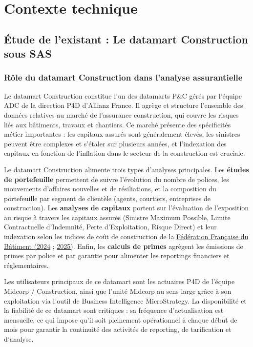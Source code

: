 \chapter{Contexte technique}

\section{Étude de l'existant : Le datamart Construction sous SAS}

\subsection{Rôle du datamart Construction dans l'analyse assurantielle}

Le datamart Construction constitue l'un des datamarts P\&C gérés par l'équipe ADC de la direction P4D d'Allianz France. Il agrège et structure l'ensemble des données relatives au marché de l'assurance construction, qui couvre les risques liés aux bâtiments, travaux et chantiers. Ce marché présente des spécificités métier importantes : les capitaux assurés sont généralement élevés, les sinistres peuvent être complexes et s'étaler sur plusieurs années, et l'indexation des capitaux en fonction de l'inflation dans le secteur de la construction est cruciale.

Le datamart Construction alimente trois types d'analyses principales. Les \textbf{études de portefeuille} permettent de suivre l'évolution du nombre de polices, les mouvements d'affaires nouvelles et de résiliations, et la composition du portefeuille par segment de clientèle (agents, courtiers, entreprises de construction). Les \textbf{analyses de capitaux} portent sur l'évaluation de l'exposition au risque à travers les capitaux assurés (Sinistre Maximum Possible, Limite Contractuelle d'Indemnité, Perte d'Exploitation, Risque Direct) et leur indexation selon les indices de coût de construction de la \hyperlink{ref.ffb_2024}{Fédération Française du Bâtiment (2024} ; \hyperlink{ref.ffb_2025}{2025)}. Enfin, les \textbf{calculs de primes} agrègent les émissions de primes par police et par garantie pour alimenter les reportings financiers et réglementaires.

Les utilisateurs principaux de ce datamart sont les actuaires P4D de l'équipe Midcorp / Construction, ainsi que l'unité Midcorp au sens large grâce à son exploitation via l'outil de Business Intelligence MicroStrategy. La disponibilité et la fiabilité de ce datamart sont critiques : sa fréquence d'actualisation est mensuelle, ce qui impose qu'il soit pleinement opérationnel à chaque début de mois pour garantir la continuité des activités de reporting, de tarification et d'analyse.


